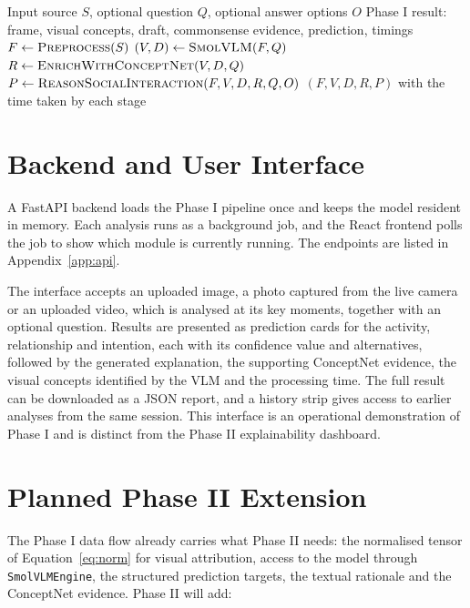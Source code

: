 \documentclass[12pt,a4paper,oneside]{report}
\newcommand{\code}[1]{\texttt{#1}}
\begin{document}
\begin{algorithm}[htbp]
\caption{Phase I pipeline}
\label{alg:pipeline}
\begin{algorithmic}[1]
\Require Input source $S$, optional question $Q$, optional answer options $O$
\Ensure Phase I result: frame, visual concepts, draft, commonsense evidence, prediction, timings
\State $F \gets \textsc{Preprocess}(S)$ 
\State $(V, D) \gets \textsc{SmolVLM}(F, Q)$ 
\State $R \gets \textsc{EnrichWithConceptNet}(V, D, Q)$ 
\State $P \gets \textsc{ReasonSocialInteraction}(F, V, D, R, Q, O)$ 
\State \Return $(F, V, D, R, P)$ with the time taken by each stage
\end{algorithmic}
\end{algorithm}

\section{Backend and User Interface}

A FastAPI backend loads the Phase I pipeline once and keeps the model resident
in memory. Each analysis runs as a background job, and the React frontend polls
the job to show which module is currently running. The endpoints are listed in
Appendix~\ref{app:api}.

The interface accepts an uploaded image, a photo captured from the live camera
or an uploaded video, which is analysed at its key moments, together with an
optional question. Results are presented as prediction cards for the activity,
relationship and intention, each with its confidence value and alternatives,
followed by the generated explanation, the supporting ConceptNet evidence, the
visual concepts identified by the VLM and the processing time. The full result
can be downloaded as a JSON report, and a history strip gives access to earlier
analyses from the same session. This interface is an operational demonstration
of Phase I and is distinct from the Phase II explainability dashboard.

\section{Planned Phase II Extension}
\label{sec:phase2plan}

The Phase I data flow already carries what Phase II needs: the normalised tensor
of Equation~\ref{eq:norm} for visual attribution, access to the model through
\code{SmolVLMEngine}, the structured prediction targets, the textual rationale
and the ConceptNet evidence. Phase II will add:
\end{document}
